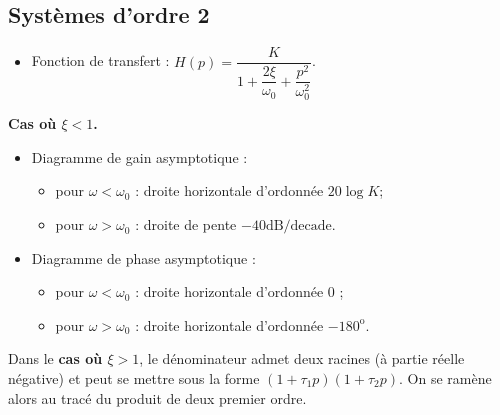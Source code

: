 \subsection{Systèmes d'ordre 2}

\begin{marginfigure}
\end{marginfigure}

\begin{resultat}
\begin{itemize}
\item Fonction de transfert : $H(p)=\dfrac{K}{1+\dfrac{2\xi}{\omega_0}+\dfrac{p^2}{\omega_0^2}}$.
\end{itemize}
\begin{center}
\textbf{Cas où $\xi<1$.}
\end{center}
\begin{itemize}
\item Diagramme de gain asymptotique : 
\begin{itemize}
\item pour $\omega<\omega_0$ : droite horizontale d'ordonnée $20 \log K$;
\item pour $\omega>\omega_0$ : droite de pente $-{40}\text{dB/decade}$.
\end{itemize}
\item Diagramme de phase asymptotique : 
\begin{itemize}
\item pour $\omega<\omega_0$ : droite horizontale d'ordonnée 0 \degre;
\item pour $\omega>\omega_0$ : droite horizontale d'ordonnée $-180^{\text{o}}$.
\end{itemize}
\end{itemize}


Dans le \textbf{cas où $\xi>1$}, le dénominateur admet deux racines (à partie réelle négative) et peut se mettre sous la forme  $\left(1+\tau_1 p \right)\left(1+\tau_2 p \right)$. On se ramène alors au tracé du produit de deux premier ordre.
\end{resultat}


